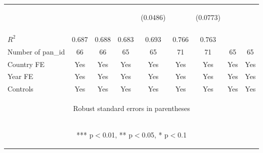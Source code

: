 \documentclass[]{article}
\begin{document}
\begin{center}
\begin{tabular}{lcccccccc}
 & \begin{footnotesize}\end{footnotesize} & \begin{footnotesize}\end{footnotesize} & \begin{footnotesize}\end{footnotesize} & \begin{footnotesize}(0.0486)\end{footnotesize} & \begin{footnotesize}\end{footnotesize} & \begin{footnotesize}(0.0773)\end{footnotesize} & \begin{footnotesize}\end{footnotesize} & \begin{footnotesize}\end{footnotesize} \\
\vspace{4pt} & \begin{footnotesize}\end{footnotesize} & \begin{footnotesize}\end{footnotesize} & \begin{footnotesize}\end{footnotesize} & \begin{footnotesize}\end{footnotesize} & \begin{footnotesize}\end{footnotesize} & \begin{footnotesize}\end{footnotesize} & \begin{footnotesize}\end{footnotesize} & \begin{footnotesize}\end{footnotesize} \\
$R^2$ & 0.687 & 0.688 & 0.683 & 0.693 & 0.766 & 0.763 &  &  \\
Number of pan\_id & 66 & 66 & 65 & 65 & 71 & 71 & 65 & 65 \\
Country FE & Yes & Yes & Yes & Yes & Yes & Yes & Yes & Yes \\
Year FE & Yes & Yes & Yes & Yes & Yes & Yes & Yes & Yes \\
 Controls & Yes & Yes & Yes & Yes & Yes & Yes & Yes & Yes \\ \hline
\multicolumn{9}{c}{\begin{footnotesize} Robust standard errors in parentheses\end{footnotesize}} \\
\multicolumn{9}{c}{\begin{footnotesize} *** p$<$0.01, ** p$<$0.05, * p$<$0.1\end{footnotesize}} \\
\end{tabular}
\end{center}
\end{document}

